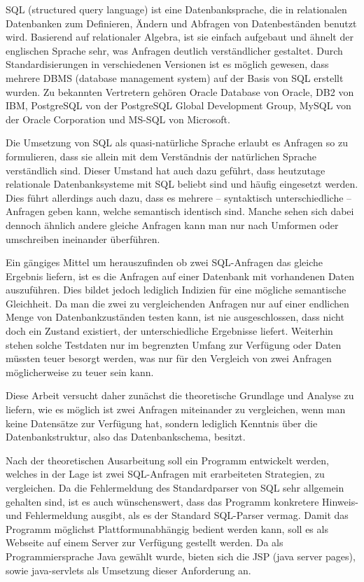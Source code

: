 SQL (structured query language) ist eine Datenbanksprache, die in relationalen Datenbanken zum Definieren, Ändern und Abfragen von Datenbeständen benutzt wird. Basierend auf relationaler Algebra, ist sie einfach aufgebaut und ähnelt der englischen Sprache sehr, was Anfragen deutlich verständlicher gestaltet. Durch Standardisierungen in verschiedenen Versionen ist es möglich gewesen, dass mehrere DBMS (database management system) auf der Basis von SQL erstellt wurden. Zu bekannten Vertretern gehören Oracle Database von Oracle, DB2 von IBM, PostgreSQL von der PostgreSQL Global Development Group, MySQL von der Oracle Corporation und MS-SQL von Microsoft.

Die Umsetzung von SQL als quasi-natürliche Sprache erlaubt es Anfragen so zu formulieren, dass sie allein mit dem Verständnis der natürlichen Sprache verständlich sind. Dieser Umstand hat auch dazu geführt, dass heutzutage relationale Datenbanksysteme mit SQL beliebt sind und häufig eingesetzt werden. 
Dies führt allerdings auch dazu, dass es mehrere -- syntaktisch unterschiedliche -- Anfragen geben kann, welche semantisch identisch sind. Manche sehen sich dabei dennoch ähnlich andere gleiche Anfragen kann man nur nach Umformen oder umschreiben ineinander überführen. 

Ein gängiges Mittel um herauszufinden ob zwei SQL-Anfragen das gleiche Ergebnis liefern, ist es die Anfragen auf einer Datenbank mit vorhandenen Daten auszuführen. Dies bildet jedoch lediglich Indizien für eine mögliche semantische Gleichheit. Da man die zwei zu vergleichenden Anfragen nur auf einer endlichen Menge von Datenbankzuständen testen kann, ist nie ausgeschlossen, dass nicht doch ein Zustand existiert, der unterschiedliche Ergebnisse liefert. Weiterhin stehen solche Testdaten nur im begrenzten Umfang zur Verfügung oder Daten müssten teuer besorgt werden, was nur für den Vergleich von zwei Anfragen möglicherweise zu teuer sein kann.

Diese Arbeit versucht daher zunächst die theoretische Grundlage und Analyse zu liefern, wie es möglich ist zwei Anfragen miteinander zu vergleichen, wenn man keine Datensätze zur Verfügung hat, sondern lediglich Kenntnis über die Datenbankstruktur, also das Datenbankschema, besitzt.

Nach der theoretischen Ausarbeitung soll ein Programm entwickelt werden, welches in der Lage ist zwei SQL-Anfragen mit erarbeiteten Strategien, zu vergleichen. Da die Fehlermeldung des Standardparser von SQL sehr allgemein gehalten sind, ist es auch wünschenswert, dass das Programm konkretere Hinweis- und Fehlermeldung ausgibt, als es der Standard SQL-Parser vermag. Damit das Programm möglichst Plattformunabhängig bedient werden kann, soll es als Webseite auf einem Server zur Verfügung gestellt werden. Da als Programmiersprache Java gewählt wurde, bieten sich die JSP (java server pages), sowie java-servlets als Umsetzung dieser Anforderung an.

